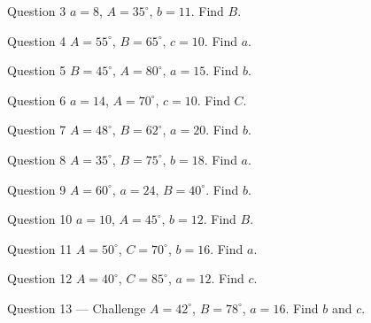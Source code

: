 \documentclass[11pt]{article}
\begin{document}
\begin{qbox}{Question 3}
$a=8$, $A=35^\circ$, $b=11$. Find $B$.\workspace{2.2cm}
\end{qbox}

\begin{qbox}{Question 4}
$A=55^\circ$, $B=65^\circ$, $c=10$. Find $a$.\workspace{2.4cm}
\end{qbox}

\begin{qbox}{Question 5}
$B=45^\circ$, $A=80^\circ$, $a=15$. Find $b$.\workspace{2.2cm}
\end{qbox}

\begin{qbox}{Question 6}
$a=14$, $A=70^\circ$, $c=10$. Find $C$.\workspace{2.2cm}
\end{qbox}

\begin{qbox}{Question 7}
$A=48^\circ$, $B=62^\circ$, $a=20$. Find $b$.\workspace{2.2cm}
\end{qbox}

\begin{qbox}{Question 8}
$A=35^\circ$, $B=75^\circ$, $b=18$. Find $a$.\workspace{2.4cm}
\end{qbox}

\begin{qbox}{Question 9}
$A=60^\circ$, $a=24$, $B=40^\circ$. Find $b$.\workspace{2.2cm}
\end{qbox}

\begin{qbox}{Question 10}
$a=10$, $A=45^\circ$, $b=12$. Find $B$.\workspace{2.2cm}
\end{qbox}

\begin{qbox}{Question 11}
$A=50^\circ$, $C=70^\circ$, $b=16$. Find $a$.\workspace{2.4cm}
\end{qbox}

\begin{qbox}{Question 12}
$A=40^\circ$, $C=85^\circ$, $a=12$. Find $c$.\workspace{2.4cm}
\end{qbox}

\begin{qbox}{Question 13 --- Challenge}
$A=42^\circ$, $B=78^\circ$, $a=16$. Find $b$ and $c$.\workspace{3.0cm}
\end{qbox}

\clearpage
{}
\end{document}
